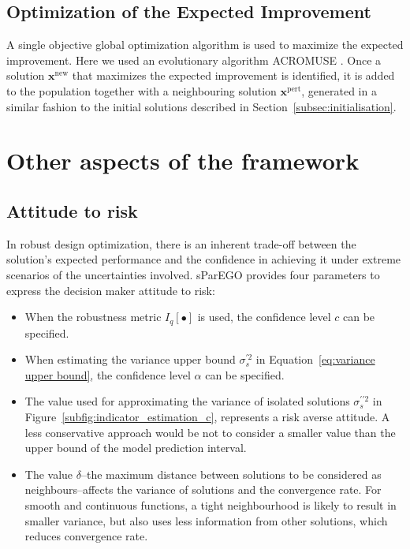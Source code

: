 \documentclass[10pt]{llncs}
\newcommand{\Iq}[1]{I_q\!\left[{#1}\right]} %
\newcommand{\vx}{\mathbf{x}} %
\begin{document}
\subsection{Optimization of the Expected Improvement}
A single objective global optimization algorithm is used to maximize the expected improvement.
Here we used an evolutionary algorithm ACROMUSE \cite{Ginley2011}.
Once a solution $\vx^\text{new}$ that maximizes the expected improvement is identified, it is added to the population together with a neighbouring solution $\vx^\text{pert}$, generated in a similar fashion to the initial solutions described in Section~\ref{subsec:initialisation}.

\section{Other aspects of the framework}
\label{sec:Other aspects}
\subsection{Attitude to risk}
\label{subsec:risk}
In robust design optimization, there is an inherent trade-off between the solution's expected performance and the confidence in achieving it under extreme scenarios of the uncertainties involved. sParEGO provides four parameters to express the decision maker attitude to risk:
\begin{itemize}
	\item When the robustness metric $\Iq{\bullet}$ is used, the confidence level $c$ can be specified.
	\item When estimating the variance upper bound $\sigma^{\prime 2}_s$  in Equation~\eqref{eq:variance upper bound}, the confidence level $\alpha$ can be specified.
	\item The value used for approximating the variance of isolated solutions $\sigma^{\prime\prime 2}_s$ in Figure~\ref{subfig:indicator_estimation_c}, represents a risk averse attitude. A less conservative approach would be not to consider a smaller value than the upper bound of the model prediction interval.
	\item The value $\delta$--the maximum distance between solutions to be considered as neighbours--affects the variance of solutions and the convergence rate.
		For smooth and continuous functions, a tight neighbourhood is likely to result in smaller variance, but also uses less information from other solutions, which reduces convergence rate.
\end{itemize}
\end{document}
